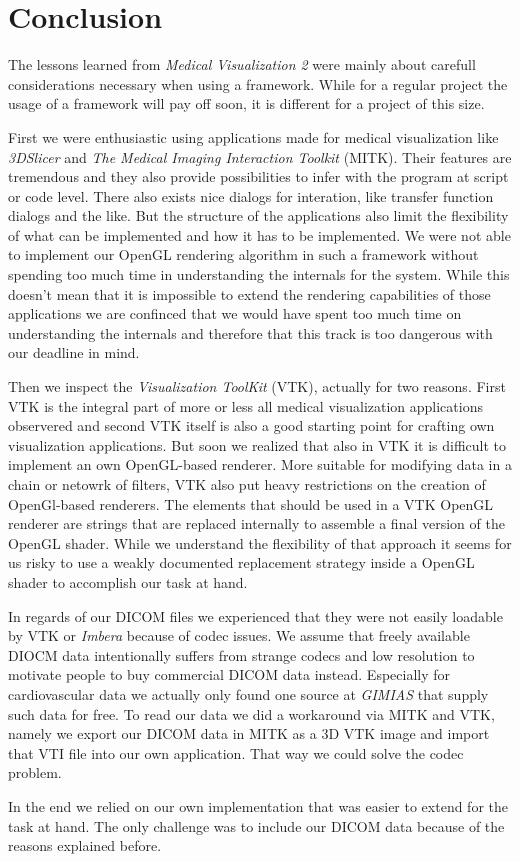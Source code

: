 \section{Conclusion}

The lessons learned from \emph{Medical Visualization 2} were mainly about carefull considerations necessary when using a framework.
While for a regular project the usage of a framework will pay off soon, it is different for a project of this size.

First we were enthusiastic using applications made for medical visualization like \emph{3DSlicer} and \emph{The Medical Imaging Interaction Toolkit} (MITK). Their features are tremendous and they also provide possibilities to infer with the program at script or code level. There also exists nice dialogs for interation, like transfer function dialogs and the like.
But the structure of the applications also limit the flexibility of what can be implemented and how it has to be implemented.
We were not able to implement our OpenGL rendering algorithm in such a framework without spending too much time in understanding the internals for the system. While this doesn't mean that it is impossible to extend the rendering capabilities of those applications we are confinced that we would have spent too much time on understanding the internals and therefore that this track is too dangerous with our deadline in mind. 

Then we inspect the \emph{Visualization ToolKit} (VTK), actually for two reasons. First VTK is the integral part of more or less all medical visualization applications observered and second VTK itself is also a good starting point for crafting own visualization applications.
But soon we realized that also in VTK it is difficult to implement an own OpenGL-based renderer. More suitable for modifying data in a chain or netowrk of filters, VTK also put heavy restrictions on the creation of OpenGl-based renderers. The elements that should be used in a VTK OpenGL renderer are strings that are replaced internally to assemble a final version of the OpenGL shader. While we understand the flexibility of that approach it seems for us risky to use a weakly documented replacement strategy inside a OpenGL shader to accomplish our task at hand.  

In regards of our DICOM files we experienced that they were not easily loadable by VTK or \emph{Imbera} because of codec issues. We assume that freely available DIOCM data intentionally suffers from strange codecs and low resolution to motivate people to buy commercial DICOM data instead.
Especially for cardiovascular data we actually only found one source at \emph{GIMIAS} that supply such data for free.
To read our data we did a workaround via MITK and VTK, namely we export our DICOM data in MITK as a 3D VTK image and import that VTI file into our own application. That way we could solve the codec problem.


In the end we relied on our own implementation that was easier to extend for the task at hand. The only challenge was to include our DICOM data because of the reasons explained before. 

